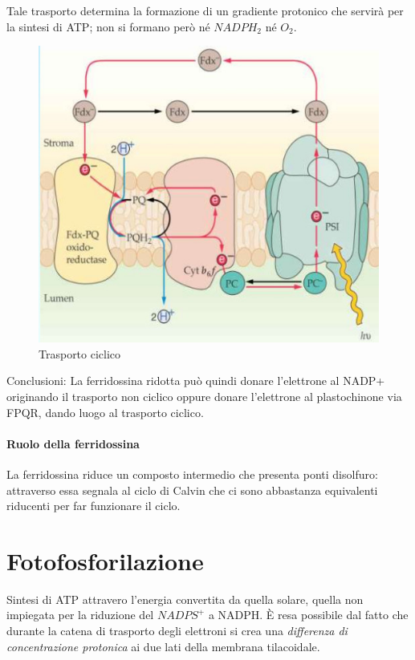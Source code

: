 \documentclass[a4paper,12pt]{book}
\begin{document}
Tale trasporto determina la formazione di un gradiente protonico che servirà per la sintesi di ATP; non si formano però
né $NADPH_{2}$ né $O_{2}$.
\begin{figure}[H]
\centering
\includegraphics[scale=0.4]{immagini/ciclico.jpg}
\caption{Trasporto ciclico}
\end{figure}

Conclusioni: La ferridossina ridotta può quindi donare l’elettrone al NADP+ originando il trasporto non ciclico oppure donare l’elettrone al plastochinone via FPQR, dando luogo al trasporto ciclico.


\paragraph{Ruolo della ferridossina}
La ferridossina riduce un composto intermedio che presenta ponti disolfuro: attraverso essa segnala al ciclo di Calvin che ci sono abbastanza equivalenti riducenti per far funzionare il ciclo.

\section{Fotofosforilazione}
Sintesi di ATP attravero l'energia convertita da quella solare, quella non impiegata per la riduzione del $NADPS^{+}$ a NADPH. È resa possibile dal fatto che durante la catena di trasporto degli elettroni si crea una \emph{differenza di concentrazione protonica} ai due lati della membrana tilacoidale.
\end{document}
